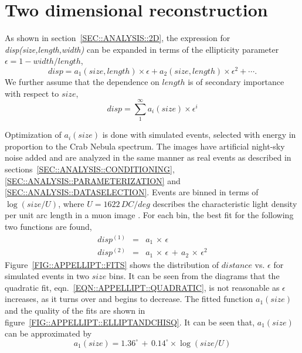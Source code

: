 \chapter{Two dimensional reconstruction}
\label{APP::ELLIPT}

As shown in section~\ref{SEC::ANALYSIS::2D}, the expression for
\textit{disp(size,length,width)} can be expanded in terms of the
ellipticity parameter $\epsilon=1-width/length$, 
\[disp = a_1(size,length)\times \epsilon + a_2(size,length)\times
\epsilon^2 + \cdots.\]
We further assume that the dependence on $length$ is of secondary
importance with respect to $size$,
\[disp = \sum_1^\infty a_i(size)\times\epsilon^i\]

Optimization of $a_i(size)$ is done with simulated \Gray events,
selected with energy in proportion to the Crab Nebula spectrum. The
images have artificial night-sky noise added and are analyzed in the
same manner as real events as described in
sections~\ref{SEC::ANALYSIS::CONDITIONING},
\ref{SEC::ANALYSIS::PARAMETERIZATION} and
\ref{SEC::ANALYSIS::DATASELECTION}. Events are binned in terms of 
$\log(size/U)$, where $U=1622\,DC/deg$ describes the characteristic
light density per unit arc length in a muon image
\citep{REF::HORAN::2001THESIS}. For each bin, the best fit for the
following two functions are found,
\begin{eqnarray}
disp^{(1)} & = & a_1\,\times\,\epsilon \label{EQN::APPELLIPT::LINEAR}\\
disp^{(2)} & = & a_1\,\times\,\epsilon\,+\,a_2\,\times\,\epsilon^2 \label{EQN::APPELLIPT::QUADRATIC}
\end{eqnarray}
Figure~\ref{FIG::APPELLIPT::FITS} shows the distribution of $distance$
vs.  $\epsilon$ for simulated events in two $size$ bins. It can be
seen from the diagrams that the quadratic fit,
eqn.~\ref{EQN::APPELLIPT::QUADRATIC}, is not reasonable as $\epsilon$
increases, as it turns over and begins to decrease. The fitted
function $a_1(size)$ and the quality of the fits are shown in
figure~\ref{FIG::APPELLIPT::ELLIPTANDCHISQ}. It can be seen that,
$a_1(size)$ can be approximated by
\begin{equation}
a_1(size)=1.36^\circ\,+\,0.14^\circ\times\log(size/U) \label{EQN::APPELLIPT::A1}
\end{equation}

